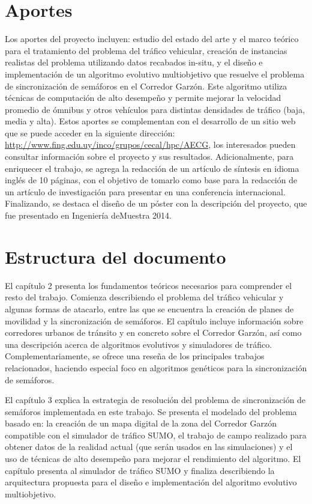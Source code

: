 \section{Aportes}
Los aportes del proyecto incluyen: estudio del estado del arte y el marco teórico para el tratamiento del problema del tráfico vehicular, creación de instancias realistas del problema utilizando datos recabados in-situ, y el diseño e implementación de un algoritmo evolutivo multiobjetivo que resuelve el problema de sincronización de semáforos en el Corredor Garzón. Este algoritmo utiliza técnicas de computación de alto desempeño y permite mejorar la velocidad promedio de ómnibus y otros vehículos para distintas densidades de tráfico (baja, media y alta). Estos aportes se complementan con el desarrollo de un sitio web que se puede acceder en la siguiente dirección: \url{http://www.fing.edu.uy/inco/grupos/cecal/hpc/AECG}, los interesados pueden consultar información sobre el proyecto y sus resultados. Adicionalmente, para enriquecer el trabajo, se agrega la redacción de un artículo de síntesis en idioma inglés de 10 páginas, con el objetivo de tomarlo como base para la redacción de un artículo de investigación para presentar en una conferencia internacional. Finalizando, se destaca el diseño de un póster con la descripción del proyecto, que fue presentado en Ingeniería deMuestra 2014.



\section{Estructura del documento}
El capítulo 2 presenta los fundamentos teóricos necesarios para comprender el resto del trabajo. Comienza describiendo el problema del tráfico vehicular y algunas formas de atacarlo, entre las que se encuentra la creación de planes de movilidad y la sincronización de semáforos. El capítulo incluye información sobre corredores urbanos de tránsito y en concreto sobre el Corredor Garzón, así como una descripción acerca de algoritmos evolutivos y simuladores de tráfico. Complementariamente, se ofrece una reseña de los principales trabajos relacionados, haciendo especial foco en algoritmos genéticos para la sincronización de semáforos.

El capítulo 3 explica la estrategia de resolución del problema de sincronización de semáforos implementada en este trabajo. Se presenta el modelado del problema basado en: la creación de un mapa digital de la zona del Corredor Garzón compatible con el simulador de tráfico SUMO, el trabajo de campo realizado para obtener datos de la realidad actual (que serán usados en las simulaciones) y el uso de técnicas de alto desempeño para mejorar el rendimiento del algoritmo. El capítulo presenta al simulador de tráfico SUMO y finaliza describiendo la arquitectura propuesta para el diseño e implementación del algoritmo evolutivo multiobjetivo.

